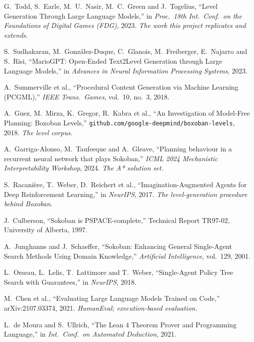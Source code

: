 \documentclass[11pt,a4paper]{report}
\begin{document}
\begin{enumerate}[leftmargin=2.2em,itemsep=3pt,label={[\arabic*]}]
\item G.\ Todd, S.\ Earle, M.\ U.\ Nasir, M.\ C.\ Green and J.\ Togelius,
      ``Level Generation Through Large Language Models,'' in \emph{Proc.\ 18th
      Int.\ Conf.\ on the Foundations of Digital Games (FDG)}, 2023.
      \emph{The work this project replicates and extends.}
\item S.\ Sudhakaran, M.\ González-Duque, C.\ Glanois, M.\ Freiberger,
      E.\ Najarro and S.\ Risi, ``MarioGPT: Open-Ended Text2Level Generation
      through Large Language Models,'' in \emph{Advances in Neural Information
      Processing Systems}, 2023.
\item A.\ Summerville et al., ``Procedural Content Generation via Machine
      Learning (PCGML),'' \emph{IEEE Trans.\ Games}, vol.\ 10, no.\ 3, 2018.
\item A.\ Guez, M.\ Mirza, K.\ Gregor, R.\ Kabra et al., ``An Investigation of
      Model-Free Planning: Boxoban Levels,''
      \texttt{github.com/google-deepmind/boxoban-levels}, 2018.
      \emph{The level corpus.}
\item A.\ Garriga-Alonso, M.\ Taufeeque and A.\ Gleave, ``Planning behaviour in a
      recurrent neural network that plays Sokoban,'' \emph{ICML 2024 Mechanistic
      Interpretability Workshop}, 2024. \emph{The A* solution set.}
\item S.\ Racanière, T.\ Weber, D.\ Reichert et al., ``Imagination-Augmented
      Agents for Deep Reinforcement Learning,'' in \emph{NeurIPS}, 2017.
      \emph{The level-generation procedure behind Boxoban.}
\item J.\ Culberson, ``Sokoban is PSPACE-complete,'' Technical Report TR97-02,
      University of Alberta, 1997.
\item A.\ Junghanns and J.\ Schaeffer, ``Sokoban: Enhancing General Single-Agent
      Search Methods Using Domain Knowledge,'' \emph{Artificial Intelligence},
      vol.\ 129, 2001.
\item L.\ Orseau, L.\ Lelis, T.\ Lattimore and T.\ Weber, ``Single-Agent Policy
      Tree Search with Guarantees,'' in \emph{NeurIPS}, 2018.
\item M.\ Chen et al., ``Evaluating Large Language Models Trained on Code,''
      arXiv:2107.03374, 2021. \emph{HumanEval; execution-based evaluation.}
\item L.\ de Moura and S.\ Ullrich, ``The Lean 4 Theorem Prover and Programming
      Language,'' in \emph{Int.\ Conf.\ on Automated Deduction}, 2021.

\end{enumerate}
\end{document}
